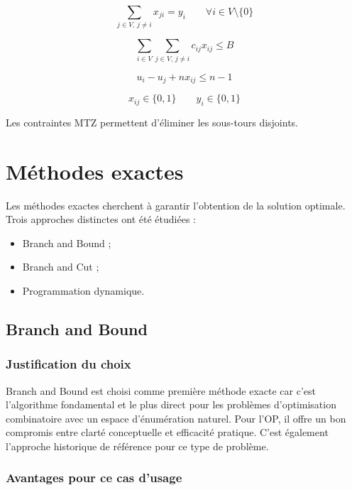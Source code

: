 \documentclass[11pt,a4paper]{article}
\begin{document}
\[
\sum_{j\in V,\, j\neq i}x_{ji}=y_i
\qquad
\forall i\in V\setminus\{0\}
\]

\[
\sum_{i\in V}\sum_{j\in V,\, j\neq i}
c_{ij}x_{ij}\le B
\]

\[
u_i-u_j+n x_{ij}\le n-1
\]

\[
x_{ij}\in\{0,1\}
\qquad
y_i\in\{0,1\}
\]

Les contraintes MTZ permettent d'éliminer les sous-tours disjoints.


\section{Méthodes exactes}

Les méthodes exactes cherchent à garantir l'obtention de la solution optimale. Trois approches distinctes ont été étudiées :

\begin{itemize}
    \item Branch and Bound ;
    \item Branch and Cut ;
    \item Programmation dynamique.
\end{itemize}


\subsection{Branch and Bound}

\subsubsection*{Justification du choix}

Branch and Bound est choisi comme première méthode exacte car c'est l'algorithme fondamental et le plus direct pour les problèmes d'optimisation combinatoire avec un espace d'énumération naturel. Pour l'OP, il offre un bon compromis entre clarté conceptuelle et efficacité pratique. C'est également l'approche historique de référence pour ce type de problème.

\subsubsection*{Avantages pour ce cas d'usage}
\end{document}
